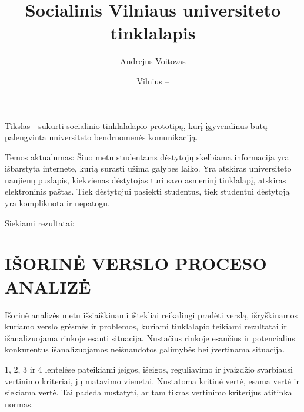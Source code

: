 \documentclass{VUMIFPSkursinis}
\title{Socialinis Vilniaus universiteto tinklalapis}
\author{Andrejus Voitovas}
\date{Vilnius – \the\year}
\begin{document}
\maketitle
\cleardoublepage{}
\setcounter{page}{2}
\newpage
\tableofcontents

Tikslas - sukurti socialinio tinklalalapio prototipą, kurį įgyvendinus būtų palengvinta universiteto bendruomenės komunikaciją.

Temos aktualumas:
Šiuo metu studentams dėstytojų skelbiama informacija yra išbarstyta internete, kurią surasti užima galybes laiko. Yra atskiras universiteto naujienų puslapis, kiekvienas dėstytojas turi savo asmeninį tinklalapį, atskiras elektroninis paštas. Tiek dėstytojui pasiekti studentus, tiek studentui dėstytoją yra komplikuota ir nepatogu.

Siekiami rezultatai:
\newpage
{}
\newpage
\section{IŠORINĖ VERSLO PROCESO ANALIZĖ}
Išorinė analizės metu išsiaiškinami ištekliai
reikalingi pradėti verslą, išryškinamos kuriamo verslo grėsmės ir
problemos, kuriami tinklalapio teikiami rezultatai ir išanalizuojama rinkoje esanti situacija. Nustačius rinkoje esančius ir potencialius konkurentus išanalizuojamos
neišnaudotos galimybės bei įvertinama situacija.

1, 2, 3 ir 4 lentelėse pateikiami įeigos, išeigos, reguliavimo ir įvaizdžio svarbiausi vertinimo kriteriai,
jų matavimo vienetai. Nustatoma kritinė vertė, esama vertė ir siekiama vertė. Tai padeda
nustatyti, ar tam tikras vertinimo kriterijus atitinka normas.
\end{document}

